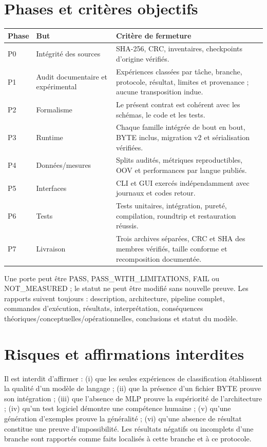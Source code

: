 \documentclass[11pt,a4paper,oneside,openany]{book}
\begin{document}
\chapter{Phases et critères objectifs}
\begin{longtable}{p{}p{}p{}}
\toprule Phase & But & Critère de fermeture\\\midrule
P0 & Intégrité des sources & SHA-256, CRC, inventaires, checkpoints d'origine vérifiés.\\
P1 & Audit documentaire et expérimental & Expériences classées par tâche, branche, protocole, résultat, limites et provenance ; aucune transposition indue.\\
P2 & Formalisme & Le présent contrat est cohérent avec les schémas, le code et les tests.\\
P3 & Runtime & Chaque famille intégrée de bout en bout, BYTE inclus, migration v2 et sérialisation vérifiées.\\
P4 & Données/mesures & Splits audités, métriques reproductibles, OOV et performances par langue publiés.\\
P5 & Interfaces & CLI et GUI exercés indépendamment avec journaux et codes retour.\\
P6 & Tests & Tests unitaires, intégration, pureté, compilation, roundtrip et restauration réussis.\\
P7 & Livraison & Trois archives séparées, CRC et SHA des membres vérifiés, taille conforme et recomposition documentée.\\
\bottomrule\end{longtable}
Une porte peut être PASS, PASS_WITH_LIMITATIONS, FAIL ou NOT_MEASURED ; le statut ne peut être modifié sans nouvelle preuve. Les rapports suivent toujours : description, architecture, pipeline complet, commandes d'exécution, résultats, interprétation, conséquences théoriques/conceptuelles/opérationnelles, conclusions et statut du modèle.

\chapter{Risques et affirmations interdites}
Il est interdit d'affirmer : (i) que les seules expériences de classification établissent la qualité d'un modèle de langage ; (ii) que la présence d'un fichier BYTE prouve son intégration ; (iii) que l'absence de MLP prouve la supériorité de l'architecture ; (iv) qu'un test logiciel démontre une compétence humaine ; (v) qu'une génération d'exemples prouve la généralité ; (vi) qu'une absence de résultat constitue une preuve d'impossibilité. Les résultats négatifs ou incomplets d'une branche sont rapportés comme faits localisés à cette branche et à ce protocole.
\end{document}
